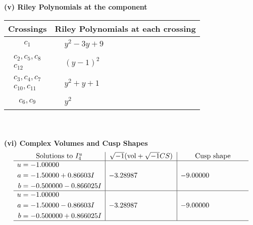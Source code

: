 \documentclass[1p]{elsarticle_modified}
\theoremstyle{definition}
\newcommand{\I}{\sqrt{-1}}
\begin{document}
\flushleft \textbf{(v) Riley Polynomials at the component}\newline \\
\begin{tabular}{m{50pt}|m{274pt}}
Crossings & \hspace{64pt}Riley Polynomials at each crossing \\
\hline $$\begin{aligned}c_{1}\end{aligned}$$&$\begin{aligned}
&y^2-3 y+9
\end{aligned}$\\
\hline $$\begin{aligned}c_{2},c_{5},c_{8}\\c_{12}\end{aligned}$$&$\begin{aligned}
&(y-1)^2
\end{aligned}$\\
\hline $$\begin{aligned}c_{3},c_{4},c_{7}\\c_{10},c_{11}\end{aligned}$$&$\begin{aligned}
&y^2+y+1
\end{aligned}$\\
\hline $$\begin{aligned}c_{6},c_{9}\end{aligned}$$&$\begin{aligned}
&y^2
\end{aligned}$\\
\hline
\end{tabular}\\~\\
\newpage\flushleft \textbf{(vi) Complex Volumes and Cusp Shapes}
$$\begin{array}{c|c|c}  
\text{Solutions to }I^u_{4}& \I (\text{vol} + \sqrt{-1}CS) & \text{Cusp shape}\\
 \hline 
\begin{aligned}
u &= -1.00000\phantom{ +0.000000I} \\
a &= -1.50000 + 0.86603 I \\
b &= -0.500000 - 0.866025 I\end{aligned}
 & -3.28987\phantom{ +0.000000I} & -9.00000\phantom{ +0.000000I} \\ \hline\begin{aligned}
u &= -1.00000\phantom{ +0.000000I} \\
a &= -1.50000 - 0.86603 I \\
b &= -0.500000 + 0.866025 I\end{aligned}
 & -3.28987\phantom{ +0.000000I} & -9.00000\phantom{ +0.000000I}\\
 \hline 
 \end{array}$$\newpage
\end{document}
